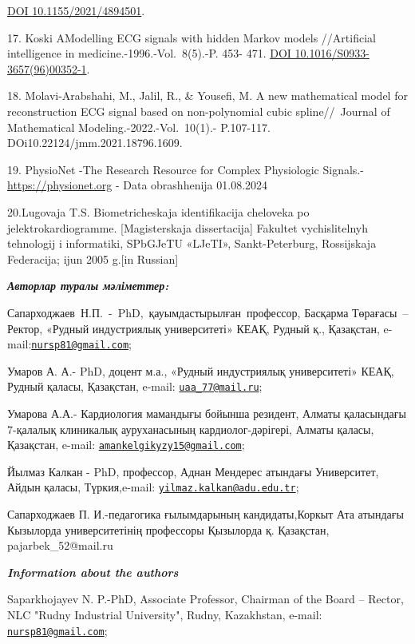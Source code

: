 \documentclass[
]{article}
\begin{document}
\href{https://doi.org/10.1155/2021/4894501}{DOI 10.1155/2021/4894501}.

17. Koski AModelling ECG signals with hidden Markov models //Artificial
intelligence in medicine.-1996.-Vol.~8(5).-P. 453- 471.
\href{https://doi.org/10.1016/S0933-3657(96)00352-1}{DOI
10.1016/S0933-3657(96)00352-1}.

18. Molavi-Arabshahi, M., Jalil, R., \& Yousefi, M. A new mathematical
model for reconstruction ECG signal based on non-polynomial cubic
spline//~Journal of Mathematical Modeling.-2022.-Vol.~10(1).- P.107-117.
DOi10.22124/jmm.2021.18796.1609.

19. PhysioNet -The Research Resource for Complex Physiologic Signals.-
\url{https://physionet.org} - Data obrashhenija 01.08.2024

20.Lugovaja T.S. Biometricheskaja identifikacija cheloveka po
jelektrokardiogramme. {[}Magisterskaja dissertacija{]}
Fakul\textquotesingle tet vychislitel\textquotesingle nyh tehnologij i
informatiki, SPbGJeTU «LJeTI», Sankt-Peterburg, Rossijskaja Federacija;
ijun\textquotesingle{} 2005 g.{[}in Russian{]}

\emph{\textbf{Авторлар туралы мәліметтер:}}

Сапарходжаев~Н.П.~-~PhD,~қауымдастырылған~профессор, Басқарма
Төрағасы~-- Ректор, «Рудный индустриялық университеті» КЕАҚ, Рудный қ.,
Қазақстан,
e-mail:\href{mailto:nursp81@gmail.com}{\nolinkurl{nursp81@gmail.com}};

Умаров А. А.- PhD, доцент м.а., «Рудный индустриялық университеті» КЕАҚ,
Рудный қаласы, Қазақстан, e-mail:
\href{mailto:uaa_77@mail.ru}{\nolinkurl{uaa\_77@mail.ru}};

Умарова А.А.- Кардиология мамандығы бойынша резидент, Алматы қаласындағы
7-қалалық клиникалық ауруханасының кардиолог-дәрігері, Алматы қаласы,
Қазақстан, e-mail:
\href{mailto:amankelgikyzy15@gmail.com}{\nolinkurl{amankelgikyzy15@gmail.com}};

Йылмаз Калкан - PhD, профессор, Аднан Мендерес атындағы Университет,
Айдын қаласы, Түркия,e-mail:
\href{mailto:yilmaz.kalkan@adu.edu.tr}{\nolinkurl{yilmaz.kalkan@adu.edu.tr}};

Сапарходжаев П. И.-педагогика ғылымдарының кандидаты,Коркыт Ата атындағы
Кызылорда университетінің профессоры Қызылорда қ. Қазақстан,
pajarbek\_52@mail.ru

\emph{\textbf{Information about the authors}}

Saparkhojayev N. P.-PhD, Associate Professor, Chairman of the Board --
Rector, NLC "Rudny Industrial University", Rudny, Kazakhstan, e-mail:
\href{mailto:nursp81@gmail.com}{\nolinkurl{nursp81@gmail.com}};
\end{document}
